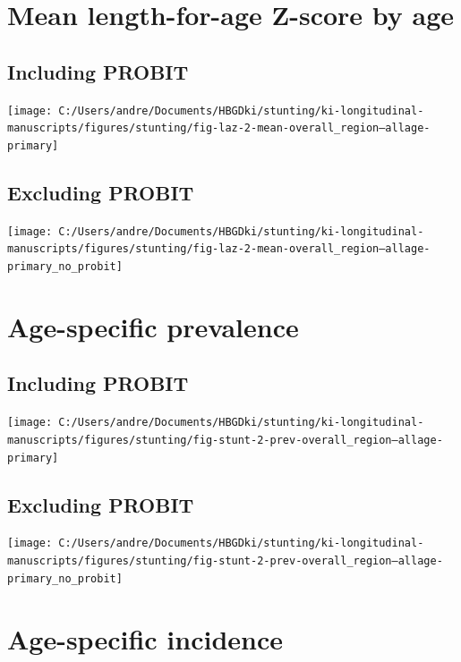 \documentclass[9pt,]{book}
\begin{document}
\section{Mean length-for-age Z-score by
age}\label{mean-length-for-age-z-score-by-age-1}

\subsection{Including PROBIT}\label{including-probit}

\texttt{[image: C:/Users/andre/Documents/HBGDki/stunting/ki-longitudinal-manuscripts/figures/stunting/fig-laz-2-mean-overall\_region--allage-primary]}

\subsection{Excluding PROBIT}\label{excluding-probit}

\texttt{[image: C:/Users/andre/Documents/HBGDki/stunting/ki-longitudinal-manuscripts/figures/stunting/fig-laz-2-mean-overall\_region--allage-primary\_no\_probit]}

\section{Age-specific prevalence}\label{age-specific-prevalence-1}

\subsection{Including PROBIT}\label{including-probit-1}

\texttt{[image: C:/Users/andre/Documents/HBGDki/stunting/ki-longitudinal-manuscripts/figures/stunting/fig-stunt-2-prev-overall\_region--allage-primary]}

\subsection{Excluding PROBIT}\label{excluding-probit-1}

\texttt{[image: C:/Users/andre/Documents/HBGDki/stunting/ki-longitudinal-manuscripts/figures/stunting/fig-stunt-2-prev-overall\_region--allage-primary\_no\_probit]}

\section{Age-specific incidence}\label{age-specific-incidence-1}
\end{document}
